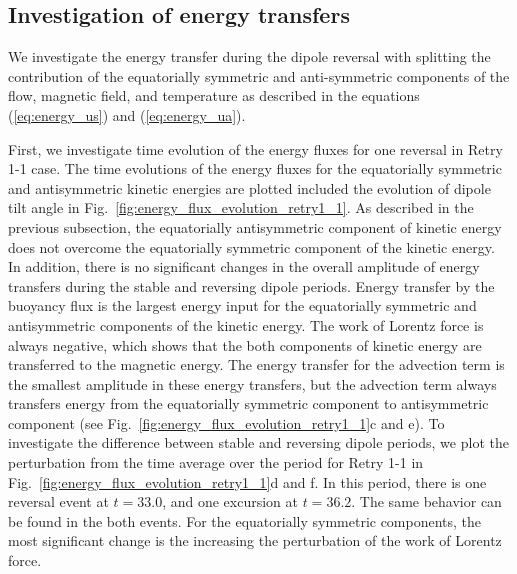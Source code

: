 {\color{red}
\subsection{Investigation of energy transfers}
}

We investigate the energy 
{\color{red} transfer}
during the dipole reversal with splitting the contribution of the equatorially symmetric and anti-symmetric components of the flow, magnetic field, and temperature as described in the equations (\ref{eq:energy_us}) and (\ref{eq:energy_ua}).

First, we investigate time evolution of the energy fluxes for one reversal in Retry 1-1 case. 
The time evolutions of the energy fluxes for the equatorially symmetric and antisymmetric kinetic energies are plotted included the evolution of dipole tilt angle in Fig.~\ref{fig:energy_flux_evolution_retry1_1}. 
As described in the previous subsection, the equatorially antisymmetric component of kinetic energy does not overcome the equatorially symmetric component of the kinetic energy. 
In addition, there is no significant changes in the overall amplitude of energy 
{\color{red} transfers}
during the stable and reversing dipole periods. 
{\color{red} Energy transfer by}
the buoyancy flux is the largest energy input for the equatorially symmetric and antisymmetric components of the kinetic energy. 
The work of Lorentz force is always negative, %
which shows that the both components of kinetic energy are transferred to the magnetic energy. 
The energy 
{\color{red} transfer}
for the advection term is the smallest amplitude in these energy 
{\color{red} transfers,}
but the advection term always transfers energy from the equatorially symmetric component to antisymmetric component 
{\color{red}
(see Fig.~\ref{fig:energy_flux_evolution_retry1_1}c and e).
}
To investigate the difference between stable and reversing dipole periods, we plot the perturbation from the time average over the period for Retry 1-1 
{\color{red}
in Fig.~\ref{fig:energy_flux_evolution_retry1_1}d and f.
} 
In this period, there is one reversal event at $t = 33.0$, and one excursion at $t = 36.2$. 
The same behavior can be found in the both events. 
For the equatorially symmetric components, the most significant change is the increasing the perturbation of the work of Lorentz force. 
